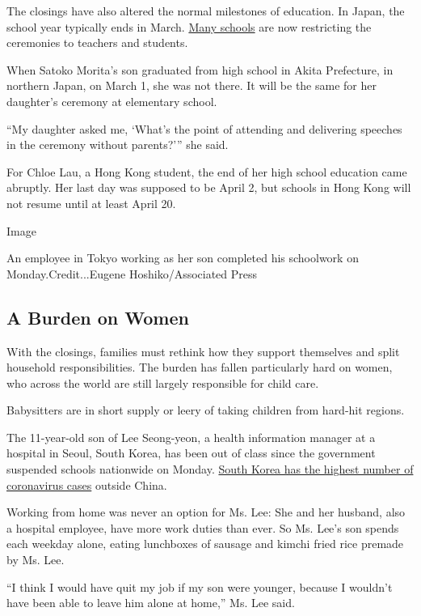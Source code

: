 The closings have also altered the normal milestones of education. In
Japan, the school year typically ends in March.
\href{https://www.nytimes3xbfgragh.onion/2020/02/27/world/asia/japan-schools-coronavirus.html}{Many
schools} are now restricting the ceremonies to teachers and students.

When Satoko Morita's son graduated from high school in Akita Prefecture,
in northern Japan, on March 1, she was not there. It will be the same
for her daughter's ceremony at elementary school.

``My daughter asked me, `What's the point of attending and delivering
speeches in the ceremony without parents?''' she said.

For Chloe Lau, a Hong Kong student, the end of her high school education
came abruptly. Her last day was supposed to be April 2, but schools in
Hong Kong will not resume until at least April 20.

Image

An employee in Tokyo working as her son completed his schoolwork on
Monday.Credit...Eugene Hoshiko/Associated Press

\hypertarget{a-burden-on-women}{%
\subsection{A Burden on Women}\label{a-burden-on-women}}

With the closings, families must rethink how they support themselves and
split household responsibilities. The burden has fallen particularly
hard on women, who across the world are still largely responsible for
child care.

Babysitters are in short supply or leery of taking children from
hard-hit regions.

The 11-year-old son of Lee Seong-yeon, a health information manager at a
hospital in Seoul, South Korea, has been out of class since the
government suspended schools nationwide on Monday.
\href{https://www.nytimes3xbfgragh.onion/2020/02/23/world/asia/south-korea-coronavirus-moon.html}{South
Korea has the highest number of coronavirus cases} outside China.

Working from home was never an option for Ms. Lee: She and her husband,
also a hospital employee, have more work duties than ever. So Ms. Lee's
son spends each weekday alone, eating lunchboxes of sausage and kimchi
fried rice premade by Ms. Lee.

``I think I would have quit my job if my son were younger, because I
wouldn't have been able to leave him alone at home,'' Ms. Lee said.

